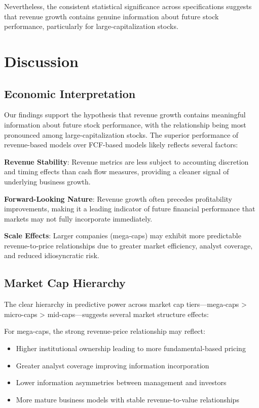 \documentclass[11pt]{article}
\begin{document}
Nevertheless, the consistent statistical significance across specifications suggests that revenue growth contains genuine information about future stock performance, particularly for large-capitalization stocks.

\section{Discussion}

\subsection{Economic Interpretation}

Our findings support the hypothesis that revenue growth contains meaningful information about future stock performance, with the relationship being most pronounced among large-capitalization stocks. The superior performance of revenue-based models over FCF-based models likely reflects several factors:

\textbf{Revenue Stability}: Revenue metrics are less subject to accounting discretion and timing effects than cash flow measures, providing a cleaner signal of underlying business growth.

\textbf{Forward-Looking Nature}: Revenue growth often precedes profitability improvements, making it a leading indicator of future financial performance that markets may not fully incorporate immediately.

\textbf{Scale Effects}: Larger companies (mega-caps) may exhibit more predictable revenue-to-price relationships due to greater market efficiency, analyst coverage, and reduced idiosyncratic risk.

\subsection{Market Cap Hierarchy}

The clear hierarchy in predictive power across market cap tiers—mega-caps > micro-caps > mid-caps—suggests several market structure effects:

For mega-caps, the strong revenue-price relationship may reflect:
\begin{itemize}
\item Higher institutional ownership leading to more fundamental-based pricing
\item Greater analyst coverage improving information incorporation
\item Lower information asymmetries between management and investors
\item More mature business models with stable revenue-to-value relationships
\end{itemize}
\end{document}
